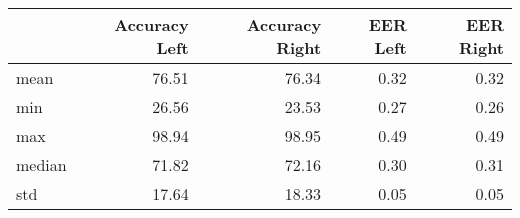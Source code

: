\begin{tabular}{lrrrr}
\toprule
{} &  Accuracy Left &  Accuracy Right &  EER Left &  EER Right \\
\midrule
mean   &          76.51 &           76.34 &      0.32 &       0.32 \\
min    &          26.56 &           23.53 &      0.27 &       0.26 \\
max    &          98.94 &           98.95 &      0.49 &       0.49 \\
median &          71.82 &           72.16 &      0.30 &       0.31 \\
std    &          17.64 &           18.33 &      0.05 &       0.05 \\
\bottomrule
\end{tabular}

